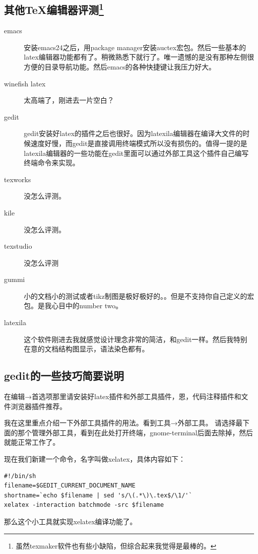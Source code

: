 \documentclass[12pt,oneside]{book}
\begin{document}
\begin{common-format}
\section[其他\TeX 编辑器评测]{其他\TeX 编辑器评测\footnote{虽然texmaker软件也有些小缺陷，但综合起来我觉得是最棒的。}}
\begin{description}
\item[emacs] 安装emacs24之后，用package manager安装auctex宏包。然后一些基本的latex编辑器功能都有了。稍微熟悉下就行了。唯一遗憾的是没有那种左侧很方便的目录导航功能。然后emacs的各种快捷键让我压力好大。
\item[winefish latex] 太高端了，刚进去一片空白？
\item[gedit] gedit安装好latex的插件之后也很好。因为latexila编辑器在编译大文件的时候速度好慢，而gedit是直接调用终端模式所以没有损伤的。值得一提的是latexila编辑器的一些功能在gedit里面可以通过外部工具这个插件自己编写终端命令来实现。
\item[texworks] 没怎么评测。
\item[kile] 没怎么评测。
\item[texstudio] 没怎么评测
\item[gummi] 小的文档小的测试或者tikz制图是极好极好的。。但是不支持你自己定义的宏包。是我心目中的number two。
\item[latexila] 这个软件刚进去我就感觉设计理念非常的简洁，和gedit一样。然后我特别在意的文档结构图显示，语法染色都有。
\end{description}


\subsection{gedit的一些技巧简要说明}
在编辑→首选项那里请安装好latex插件和外部工具插件，恩，代码注释插件和文件浏览器插件推荐。

我在这里重点介绍一下外部工具插件的用法。看到工具→外部工具。
请选择最下面的那个管理外部工具，看到在此处打开终端，gnome-terminal后面去除掉，然后就能正常工作了。

现在我们新建一个命令，名字叫做xelatex，具体内容如下：
\begin{Verbatim}
#!/bin/sh
filename=$GEDIT_CURRENT_DOCUMENT_NAME
shortname=`echo $filename | sed 's/\(.*\)\.tex$/\1/'`
xelatex -interaction batchmode -src $filename
\end{Verbatim}
那么这个小工具就实现xelatex编译功能了。


\end{common-format}
\end{document}
